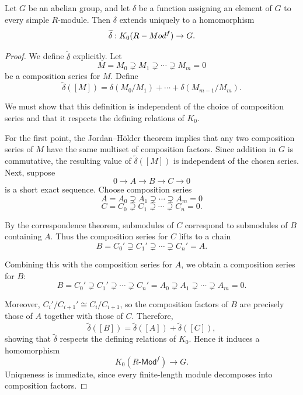 \documentclass[10pt,a4paper]{amsart}
\begin{document}
\begin{theorem}\label{thm: uprop Jordan-Holder}
Let $G$ be an abelian group, and let $\delta$ be a function assigning an element of $G$ to every simple $R$-module. Then $\delta$ extends uniquely to a homomorphism
\[
\widetilde{\delta}:
K_0(R\textsf{\emph{-Mod}}^f)\to G.
\]
\end{theorem}

\begin{proof}
We define $\widetilde{\delta}$ explicitly.
Let
\[
M=M_0\supsetneq M_1\supsetneq \cdots \supsetneq M_m=0
\]
be a composition series for $M$. Define
\[
\widetilde{\delta}([M])
=
\delta(M_0/M_1)
+\cdots+
\delta(M_{m-1}/M_m).
\]

We must show that this definition is independent of the choice of composition series and that it respects the defining relations of $K_0$.

For the first point, the Jordan--H\"older theorem implies that any two composition series of $M$ have the same multiset of composition factors. Since addition in $G$ is commutative, the resulting value of $\widetilde{\delta}([M])$ is independent of the chosen series.
Next, suppose
\[
0\longrightarrow A\longrightarrow B\longrightarrow C\longrightarrow 0
\]
is a short exact sequence.
Choose composition series
\[
A=A_0\supsetneq A_1\supsetneq \cdots \supsetneq A_m=0
\]
\[
C=C_0\supsetneq C_1\supsetneq \cdots \supsetneq C_n=0.
\]

By the correspondence theorem, submodules of $C$ correspond to submodules of $B$ containing $A$. Thus the composition series for $C$ lifts to a chain
\[
B=C_0'\supsetneq C_1'\supsetneq \cdots \supsetneq C_n'=A.
\]

Combining this with the composition series for $A$, we obtain a composition series for $B$:
\[
B=C_0'
\supsetneq C_1'
\supsetneq \cdots
\supsetneq C_n'
=
A_0
\supsetneq A_1
\supsetneq \cdots
\supsetneq A_m
=
0.
\]

Moreover, $C_i'/C_{i+1}'\cong C_i/C_{i+1}$, so the composition factors of $B$ are precisely those of $A$ together with those of $C$.
Therefore,
\[
\widetilde{\delta}([B])
=
\widetilde{\delta}([A])
+
\widetilde{\delta}([C]),
\]
showing that $\widetilde{\delta}$ respects the defining relations of $K_0$. Hence it induces a homomorphism
\[
K_0(R\textsf{-Mod}^f)\to G.
\]
Uniqueness is immediate, since every finite-length module decomposes into composition factors.
\end{proof}
\end{document}
